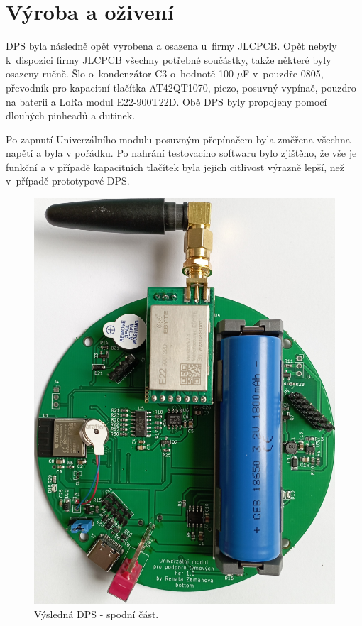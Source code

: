 \newpage
\section{Výroba a oživení}

DPS byla následně opět vyrobena a osazena u~firmy JLCPCB. Opět nebyly k~dispozici firmy JLCPCB všechny potřebné součástky, takže některé byly osazeny ručně. Šlo o~kondenzátor C3 o~hodnotě 100 $\mu$F v~pouzdře 
0805, převodník pro kapacitní tlačítka AT42QT1070, piezo, posuvný vypínač, pouzdro na baterii a LoRa modul E22-900T22D. Obě DPS byly propojeny pomocí dlouhých pinheadů a dutinek. 

Po zapnutí Univerzálního modulu posuvným přepínačem byla změřena všechna napětí a byla v pořádku. Po nahrání testovacího softwaru bylo zjištěno, že vše je funkční a v případě kapacitních tlačítek byla jejich citlivost 
výrazně lepší, než v~případě prototypové DPS. 

\begin{figure}[!h]
  \begin{center}
    \includegraphics[scale=0.15]{obrazky/DPS_final_spodni.jpg}
  \end{center}
  \caption[Výsledná DPS - spodní část]{Výsledná DPS - spodní část.}
\end{figure}

